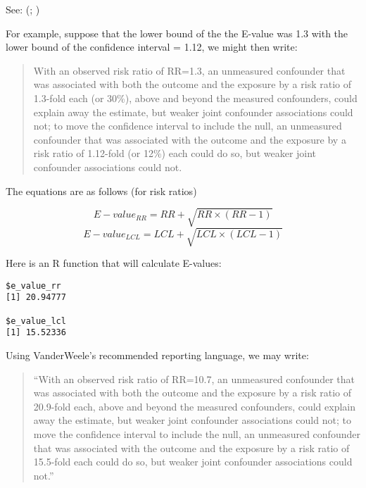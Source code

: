 \documentclass[
  singlecolumn]{article}
\begin{document}
See: (;
)

For example, suppose that the lower bound of the the E-value was 1.3
with the lower bound of the confidence interval = 1.12, we might then
write:

\begin{quote}
With an observed risk ratio of RR=1.3, an unmeasured confounder that was
associated with both the outcome and the exposure by a risk ratio of
1.3-fold each (or 30\%), above and beyond the measured confounders,
could explain away the estimate, but weaker joint confounder
associations could not; to move the confidence interval to include the
null, an unmeasured confounder that was associated with the outcome and
the exposure by a risk ratio of 1.12-fold (or 12\%) each could do so,
but weaker joint confounder associations could not.
\end{quote}

The equations are as follows (for risk ratios)

\[
E-value_{RR} = RR + \sqrt{RR \times (RR - 1)}
\] \[
E-value_{LCL} = LCL + \sqrt{LCL \times (LCL - 1)}
\]

Here is an R function that will calculate E-values:

\begin{verbatim}
$e_value_rr
[1] 20.94777

$e_value_lcl
[1] 15.52336
\end{verbatim}

Using VanderWeele's recommended reporting language, we may write:

\begin{quote}
``With an observed risk ratio of RR=10.7, an unmeasured confounder that
was associated with both the outcome and the exposure by a risk ratio of
20.9-fold each, above and beyond the measured confounders, could explain
away the estimate, but weaker joint confounder associations could not;
to move the confidence interval to include the null, an unmeasured
confounder that was associated with the outcome and the exposure by a
risk ratio of 15.5-fold each could do so, but weaker joint confounder
associations could not.''
\end{quote}
\end{document}
